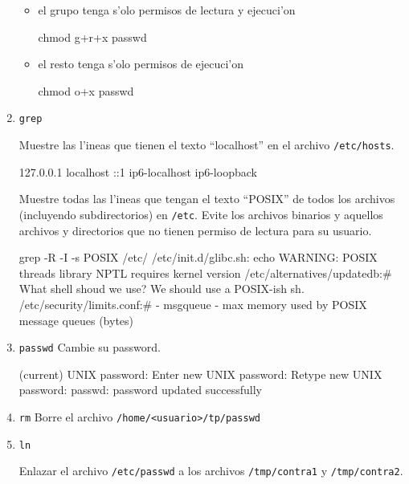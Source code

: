 \begin{enumerate}
\begin{itemize}
\item el grupo tenga s'olo permisos de lectura y ejecuci'on

\begin{envRespuesta}
chmod g+r+x passwd
\end{envRespuesta}

\item el resto tenga s'olo permisos de ejecuci'on

\begin{envRespuesta}
chmod o+x passwd
\end{envRespuesta}
\end{itemize}

\item \texttt{grep}

Muestre las l'ineas que tienen el texto ``localhost'' en el archivo \texttt{/etc/hosts}.

\begin{envCodigo}
127.0.0.1	localhost
::1     ip6-localhost ip6-loopback
\end{envCodigo}

Muestre todas las l'ineas que tengan el texto ``POSIX'' de todos los archivos (incluyendo subdirectorios) en \texttt{/etc}.
Evite los archivos binarios y aquellos archivos y directorios que no tienen permiso de lectura para su usuario.

\begin{envCodigo}
grep -R -I -s POSIX /etc/
/etc/init.d/glibc.sh:     echo WARNING: POSIX threads library NPTL requires kernel version
/etc/alternatives/updatedb:\# What shell shoud we use?  We should use a POSIX-ish sh.
/etc/security/limits.conf:\# - msgqueue - max memory used by POSIX message queues (bytes)
\end{envCodigo}

\item \texttt{passwd} Cambie su password.

\begin{envCodigo}
(current) UNIX password:
Enter new UNIX password:
Retype new UNIX password:
passwd: password updated successfully
\end{envCodigo}

\item \texttt{rm} Borre el archivo \texttt{/home/<usuario>/tp/passwd}

\item \texttt{ln}

Enlazar el archivo \texttt{/etc/passwd} a los archivos \texttt{/tmp/contra1} y \texttt{/tmp/contra2}.


\end{enumerate}
